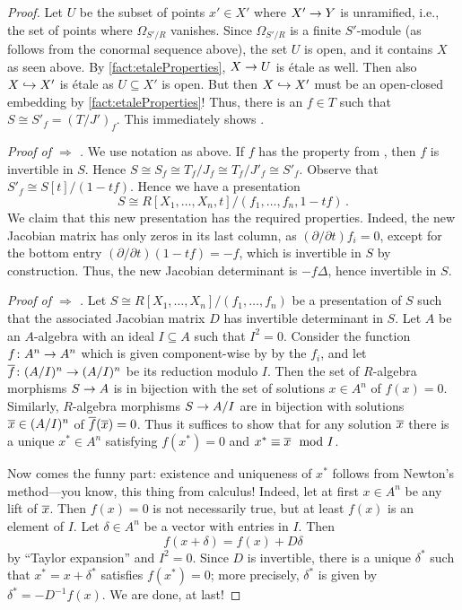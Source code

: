 \begin{proof}
	Let $U$ be the subset of points $x'\in X'$ where $X'\morphism Y$ is unramified, i.e., the set of points where $\Omega_{S'/R}$ vanishes. Since $\Omega_{S'/R}$ is a finite $S'$-module (as follows from the conormal sequence above), the set $U$ is open, and it contains $X$ as seen above. By \cref{fact:etaleProperties}, $X\morphism U$ is étale as well. Then also $X\monomorphism X'$ is étale as $U\subseteq X'$ is open. But then $X\monomorphism X'$ must be an open-closed embedding by \cref{fact:etaleProperties}! Thus, there is an $f\in T$ such that $S\cong S'_f=(T/J')_f$. This immediately shows .
	
	\emph{Proof of  $\Rightarrow$ .} We use notation as above. If $f$ has the property from , then $f$ is invertible in $S$. Hence $S\cong S_f\cong T_f/J_f\cong T_f/J'_f\cong S'_f$. Observe that $S'_f\cong S[t]/(1-tf)$. Hence we have a presentation 
	\begin{equation*}
		S\cong R[X_1,\dotsc,X_n,t]/(f_1,\dotsc,f_n,1-tf)\,.
	\end{equation*}
	We claim that this new presentation has the required properties. Indeed, the new Jacobian matrix has only zeros in its last column, as $(\partial/\partial t)f_i=0$, except for the bottom entry $(\partial/\partial t)(1-tf)=-f$, which is invertible in $S$ by construction. Thus, the new Jacobian determinant is $-f\Delta$, hence invertible in $S$.
	
	\emph{Proof of  $\Rightarrow$ .} Let $S\cong R[X_1,\dotsc,X_n]/(f_1,\dotsc,f_n)$ be a presentation of $S$ such that the associated Jacobian matrix $D$ has invertible determinant in $S$. Let $A$ be an $A$-algebra with an ideal $I\subseteq A$ such that $I^2=0$.  Consider the function $f\colon A^n\morphism A^n$ which is given component-wise by by the $f_i$, and let $\ov{f}\colon (A/I)^n\morphism (A/I)^n$ be its reduction modulo $I$. Then the set of $R$-algebra morphisms $S\morphism A$ is in bijection with the set of solutions $x\in A^n$ of $f(x)=0$. Similarly, $R$-algebra morphisms $S\morphism A/I$ are in bijection with solutions $\ov{x}\in (A/I)^n$ of $\ov{f}(\ov{x})=0$. Thus it suffices to show that for any solution $\ov{x}$ there is a unique $x^*\in A^n$ satisfying $f(x^*)=0$ and $x^*\equiv \ov{x}\mod I$.
	
	Now comes the funny part: existence and uniqueness of $x^*$ follows from Newton's method---you know, this thing from calculus! Indeed, let at first $x\in A^n$ be any lift of $\ov{x}$. Then $f(x)=0$ is not necessarily true, but at least $f(x)$ is an element of $I$. Let $\delta\in A^n$ be a vector with entries in $I$. Then 
	\begin{equation*}
		f(x+\delta)=f(x)+D\delta
	\end{equation*}
	by \enquote{Taylor expansion} and $I^2=0$. Since $D$ is invertible, there is a unique $\delta^*$ such that $x^*=x+\delta^*$ satisfies $f(x^*)=0$; more precisely, $\delta^*$ is given by $\delta^*=-D^{-1}f(x)$. We are done, at last!
\end{proof}
